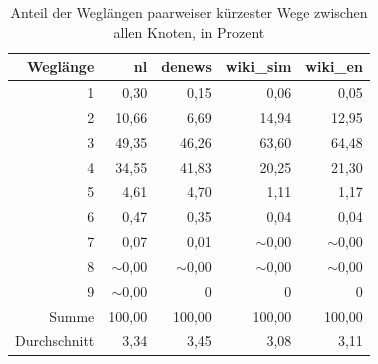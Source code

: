 \documentclass[11pt, a4paper]{article}
\begin{document}
\begin{table}[ht]
    \centering
    \begin{tabular}{rrrrr}
      \toprule
    Weglänge       & nl          & denews      & wiki\_sim   & wiki\_en     \\ 
      \midrule
      1            & 0,30        & 0,15        & 0,06        & 0,05         \\ 
      2            & 10,66       & 6,69        & 14,94       & 12,95        \\ 
      3            & 49,35       & 46,26       & 63,60       & 64,48        \\ 
      4            & 34,55       & 41,83       & 20,25       & 21,30        \\ 
      5            & 4,61        & 4,70        & 1,11        & 1,17         \\ 
      6            & 0,47        & 0,35        & 0,04        & 0,04         \\ 
      7            & 0,07        & 0,01        & $\sim$0,00  & $\sim$0,00   \\ 
      8            & $\sim$0,00  & $\sim$0,00  & $\sim$0,00  & $\sim$0,00   \\ 
      9            & $\sim$0,00  & 0           & 0           & 0            \\ 
      Summe        & 100,00      & 100,00      & 100,00      & 100,00       \\ 
      Durchschnitt & 3,34        & 3,45        & 3,08        & 3,11         \\
       \bottomrule
    \end{tabular}
    \caption{Anteil der Weglängen paarweiser kürzester Wege zwischen allen Knoten, in Prozent}
    \label{md-perc}
\end{table}
\end{document}
